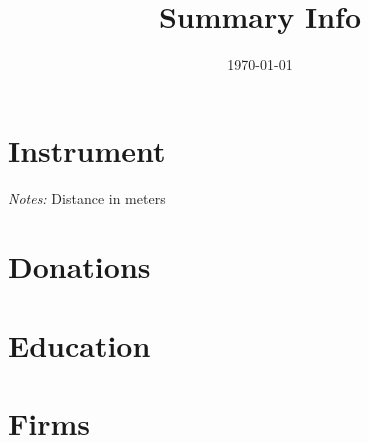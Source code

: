 \documentclass[11pt]{article}
\title{Summary Info}
\date{\today}
\begin{document}
\section{Instrument}

\textit{Notes:} Distance in meters


\clearpage
\section{Donations}












\clearpage
\section{Education}





\section{Firms}


\end{document}
